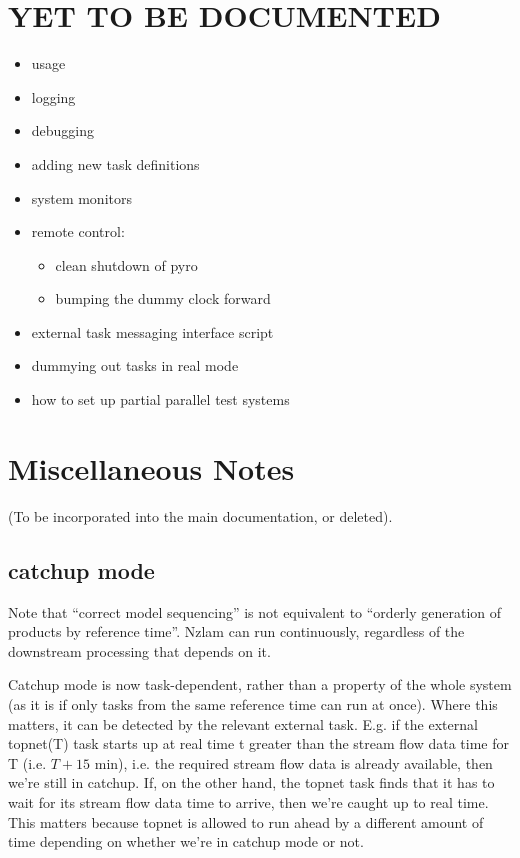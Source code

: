 \documentclass[11pt,a4paper]{article}
\begin{document}
\section{YET TO BE DOCUMENTED}

\begin{itemize}
 \item usage
 \item logging
 \item debugging
 \item adding new task definitions
 \item system monitors
 \item remote control: 
    \begin{itemize}
    \item clean shutdown of pyro
    \item bumping the dummy clock forward
    \end{itemize}
 \item external task messaging interface script
 \item dummying out tasks in real mode
 \item how to set up partial parallel test systems
\end{itemize}

\section{Miscellaneous Notes}

(To be incorporated into the main documentation, or deleted).

\subsection{catchup mode}

Note that ``correct model sequencing'' is not equivalent to ``orderly
generation of products by reference time''.  Nzlam can run continuously,
regardless of the downstream processing that depends on it.

Catchup mode is now task-dependent, rather than a property of the whole
system (as it is if only tasks from the same reference time can run at
once).  Where this matters, it can be detected by the relevant external
task. E.g. if the external topnet(T) task starts up at real time t
greater than the stream flow data time for T (i.e. $T+15$ min), i.e. the
required stream flow data is already available, then we're still in
catchup. If, on the other hand, the topnet task finds that it has to
wait for its stream flow data time to arrive, then we're caught up to
real time.  This matters because topnet is allowed to run ahead by a
different amount of time depending on whether we're in catchup mode or
not.
\end{document}
